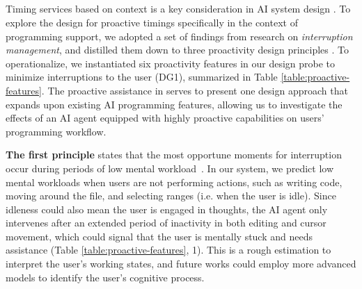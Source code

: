 \subsection{}
Timing services based on context is a key consideration in AI system design \cite{amershi2019haiprinciple}.
To explore the design for proactive timings specifically in the context of programming support, 
we adopted a set of findings from research on \textit{interruption management}, and distilled them down to three proactivity design principles \cite{Miyata1986, iqbal2005towards, czerwinski2000instant, bailey2001effects}. 
To operationalize, we instantiated six proactivity features in our design probe to minimize interruptions to the user (DG1), summarized in Table \ref{table:proactive-features}.
The proactive assistance in \sys{} serves to present one design approach that expands upon existing AI programming features, allowing us to investigate the effects of an AI agent equipped with highly proactive capabilities on users' programming workflow.

\textbf{The first principle} states that the most opportune moments for interruption occur during periods of low mental workload~\cite{bailey2001effects,czerwinski2000instant}. 
In our system, we predict low mental workloads when users are not performing actions, such as writing code, moving around the file, and selecting ranges (i.e. when the user is idle).
Since idleness could also mean the user is engaged in thoughts, the AI agent only intervenes after an extended period of inactivity in both editing and cursor movement, which could signal that the user is mentally stuck and needs assistance (Table \ref{table:proactive-features}, 1).
This is a rough estimation to interpret the user's working states, and future works could employ more advanced models to identify the user's cognitive process.


